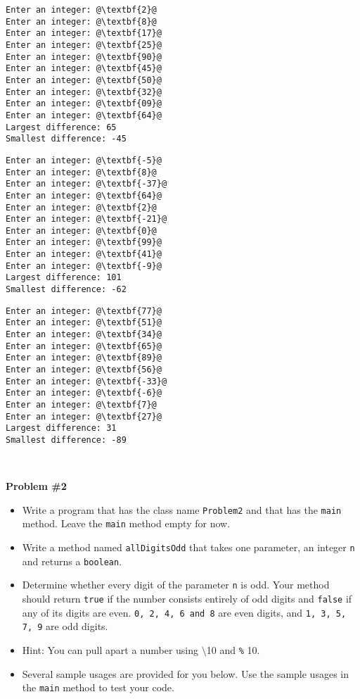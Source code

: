 \documentclass[12pt]{article}
\begin{document}
\begin{center}
\begin{minipage}{4cm}
\begin{lstlisting}[escapechar=@]
Enter an integer: @\textbf{2}@
Enter an integer: @\textbf{8}@
Enter an integer: @\textbf{17}@
Enter an integer: @\textbf{25}@
Enter an integer: @\textbf{90}@
Enter an integer: @\textbf{45}@
Enter an integer: @\textbf{50}@
Enter an integer: @\textbf{32}@
Enter an integer: @\textbf{09}@
Enter an integer: @\textbf{64}@
Largest difference: 65
Smallest difference: -45 
\end{lstlisting}
\end{minipage}
\hspace*{0.5cm}
\begin{minipage}{4cm}
\begin{lstlisting}[escapechar=@]
Enter an integer: @\textbf{-5}@
Enter an integer: @\textbf{8}@
Enter an integer: @\textbf{-37}@
Enter an integer: @\textbf{64}@
Enter an integer: @\textbf{2}@
Enter an integer: @\textbf{-21}@
Enter an integer: @\textbf{0}@
Enter an integer: @\textbf{99}@
Enter an integer: @\textbf{41}@
Enter an integer: @\textbf{-9}@
Largest difference: 101
Smallest difference: -62

\end{lstlisting}
\end{minipage}
\hspace*{0.5cm}
\begin{minipage}{4cm}
\begin{lstlisting}[escapechar=@]
Enter an integer: @\textbf{77}@
Enter an integer: @\textbf{51}@
Enter an integer: @\textbf{34}@
Enter an integer: @\textbf{65}@
Enter an integer: @\textbf{89}@
Enter an integer: @\textbf{56}@
Enter an integer: @\textbf{-33}@
Enter an integer: @\textbf{-6}@
Enter an integer: @\textbf{7}@
Enter an integer: @\textbf{27}@
Largest difference: 31
Smallest difference: -89

\end{lstlisting}
\end{minipage}\\
\end{center}
\vspace*{0.5cm}
\noindent\textbf{Problem \#2}
\begin{itemize}
	\item Write a program that has the class name \texttt{Problem2} and that has the \texttt{main} method. Leave the \texttt{main} method empty for now.
	\item Write a method named \texttt{allDigitsOdd} that takes one parameter, an integer \texttt{n} and returns a \texttt{boolean}.
	\item Determine whether every digit of the parameter \texttt{n} is odd. Your method should return \texttt{true} if the number consists entirely of odd digits and \texttt{false} if any of its digits are even. \texttt{0, 2, 4, 6 and 8} are even digits, and \texttt{1, 3, 5, 7, 9} are odd digits. 
	\item Hint: You can pull apart a number using \texttt{$\setminus$}10 and \texttt{\%} 10.
	\item Several sample usages are provided for you below. Use the sample usages in the \texttt{main} method to test your code.
\end{itemize}
\end{document}
